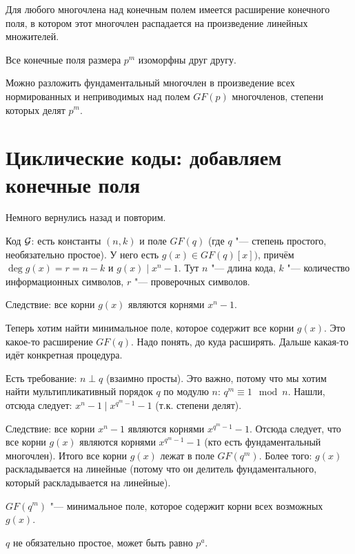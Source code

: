 \begin{theorem}
	Для любого многочлена над конечным полем имеется расширение конечного поля,
	в котором этот многочлен распадается на произведение линейных множителей.
\end{theorem}

\begin{theorem}
	Все конечные поля размера $p^m$ изоморфны друг другу.
\end{theorem}

\begin{theorem}
	Можно разложить фундаментальный многочлен в произведение
	всех нормированных и неприводимых над полем $GF(p)$ многочленов,
	степени которых делят $p^m$.
\end{theorem}

\section{Циклические коды: добавляем конечные поля}
Немного вернулись назад и повторим.

Код $\cal G$: есть константы $(n, k)$ и поле $GF(q)$
(где $q$ "--- степень простого, необязательно простое).
У него есть $g(x) \in GF(q)[x])$,
причём $\deg g(x) = r = n - k$ и $g(x) \mid x^n - 1$.
Тут $n$ "--- длина кода, $k$ "--- количество информационных символов,
$r$ "--- проверочных символов.

Следствие: все корни $g(x)$ являются корнями $x^n-1$.

Теперь хотим найти минимальное поле, которое содержит все корни $g(x)$.
Это какое-то расширение $GF(q)$.
Надо понять, до куда расширять.
Дальше какая-то идёт конкретная процедура.

Есть требование: $n \perp q$ (взаимно просты).
Это важно, потому что мы хотим найти мультипликативный
порядок $q$ по модулю $n$: $q^m \equiv 1 \mod n$.
Нашли, отсюда следует: $x^n-1 \mid x^{q^m-1}-1$ (т.к. степени делят).

Следствие: все корни $x^n-1$ являются корнями $x^{q^m-1}-1$.
Отсюда следует, что все корни $g(x)$ являются корнями  $x^{q^m-1}-1$ (кто есть фундаментальный многочлен).
Итого все корни $g(x)$ лежат в поле $GF(q^m)$.
Более того: $g(x)$ раскладывается на линейные (потому что он
делитель фундаментального, который раскладывается на линейные).
\begin{lemma}
$GF(q^m)$ "--- минимальное поле, которое содержит корни всех возможных $g(x)$.
\end{lemma}
\begin{Rem}
$q$ не обязательно простое, может быть равно $p^a$.
\end{Rem}

